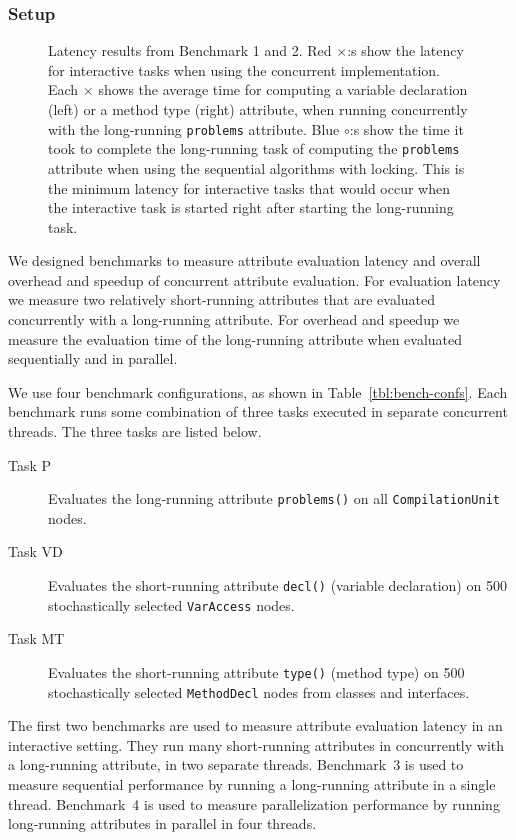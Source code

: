 {\subsubsection{Setup}
\label{setup}

\begin{figure}
  \centering
  \def\svgwidth{\textwidth}
  
  \caption{%
    Latency results from Benchmark 1 and 2. Red $\times$:s show the latency for
    interactive tasks when using the concurrent implementation.
    Each $\times$ shows the average time for computing a variable
    declaration (left) or a method type (right) attribute, when running
    concurrently with the long-running \texttt{problems} attribute. Blue $\circ$:s show
    the time it took to complete the long-running task of computing the
    \texttt{problems} attribute when using the sequential algorithms with locking.
    This is the minimum latency for interactive tasks that would occur when the
    interactive task is started right after starting the long-running task.
  }
  \label{fig:benchplot}
\end{figure}

We designed benchmarks to measure attribute evaluation latency and
overall overhead and speedup of concurrent attribute evaluation.
For evaluation latency we measure two relatively short-running
attributes that are evaluated concurrently with a long-running attribute.
For overhead and speedup we measure the evaluation time of the long-running
attribute when evaluated sequentially and in parallel.

We use four benchmark configurations, as shown in Table~\ref{tbl:bench-confs}.
Each benchmark runs some combination of three tasks executed in
separate concurrent threads. The three tasks are listed below.

\begin{description}
  \item[Task P] Evaluates the long-running attribute \verb'problems()'
    on all \verb'CompilationUnit' nodes.
  \item[Task VD] Evaluates the short-running attribute \verb'decl()' (variable declaration) on
    500 stochastically selected \verb'VarAccess' nodes.
  \item[Task MT] Evaluates the short-running attribute \verb'type()' (method type) on
    500 stochastically selected \verb'MethodDecl' nodes from classes and interfaces.
\end{description}

The first two benchmarks are used to measure attribute evaluation latency in
an interactive setting.
They run many short-running attributes in concurrently with a long-running attribute,
in two separate threads.
Benchmark~3 is used to measure sequential performance by running a
long-running attribute in a single thread.
Benchmark~4 is used to measure parallelization performance by running
long-running attributes in parallel in four threads.

}
